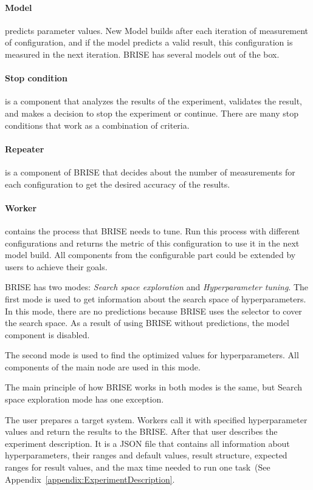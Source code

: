 \paragraph{Model} predicts parameter values. New Model builds after each iteration of measurement of configuration, and if the model predicts a valid result, this configuration is measured in the next iteration. BRISE has several models out of the box.
\paragraph{Stop condition} is a component that analyzes the results of the experiment, validates the result, and makes a decision to stop the experiment or continue. There are many stop conditions that work as a combination of criteria.
\paragraph{Repeater} is a component of BRISE that decides about the number of measurements for each configuration to get the desired accuracy of the results. 
\paragraph{Worker} contains the process that BRISE needs to tune. Run this process with different configurations and returns the metric of this configuration to use it in the next model build.
All components from the configurable part could be extended by users to achieve their goals.

BRISE has two modes: \textit{Search space exploration} and \textit{Hyperparameter tuning}.
The first mode is used to get information about the search space of hyperparameters. In this mode, there are no predictions because BRISE uses the selector to cover the search space. As a result of using BRISE without predictions, the model component is disabled.

The second mode is used to find the optimized values for hyperparameters. All components of the main node are used in this mode.

The main principle of how BRISE works in both modes is the same, but 
Search space exploration mode has one exception.

The user prepares a target system. Workers call it with specified hyperparameter values and return the results to the BRISE.
After that user describes the experiment description. It is a JSON file that contains all information about hyperparameters, their ranges and default values, result structure, expected ranges for result values, and the max time needed to run one task~(See Appendix~\ref{appendix:ExperimentDescription}.

